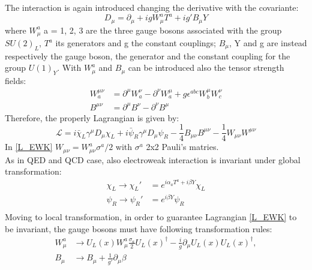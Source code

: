 The interaction is again introduced changing the derivative with the covariante:
\begin{equation}
D_{\mu} = \partial_{\mu} + igW_{\mu}^{a}T^{a} + ig'B_{\mu}Y
\label{D_EWK}
\end{equation}
where $W_{\mu}^{a}$ a = 1, 2, 3 are the three gauge bosons associated with the group $SU(2)_{L}$, $T^{a}$ its generators and g the constant couplings; $B_{\mu}$, Y and g are instead respectively the gauge boson, the generator and the constant coupling for the group $U(1)_{Y}$.
With $W_{\mu}^{a}$ and $B_{\mu}$ can be introduced also the tensor strength fields:
\begin{equation}
\begin{split}
W^{\mu\nu}_{a} &= \partial^{\mu}W^{\nu}_{a} - \partial^{\nu}W^{\mu}_{a} + g\epsilon^{abc}W^{\mu}_{b}W^{\nu}_{c} \\
B^{\mu\nu} 	 &= \partial^{\mu}B^{\nu} - \partial^{\nu}B^{\mu}
\label{WB_munu}
\end{split}
\end{equation}
Therefore, the properly Lagrangian is given by:
\begin{equation}
\mathcal{L} = i\bar{\chi}_{L}\gamma^{\mu}D_{\mu}\chi_{L} + i\bar{\psi}_{R}\gamma^{\mu}D_{\mu}\psi_{R} - \frac{1}{4}B_{\mu\nu}B^{\mu\nu} - \frac{1}{4}W_{\mu\nu}W^{\mu\nu}
\label{L_EWK}
\end{equation}
In \ref{L_EWK} $W_{\mu\nu} = W^{a}_{\mu\nu}\sigma^{a}/2$ with $\sigma^{a}$ 2x2 Pauli's matries. \\
As in QED and QCD case, also electroweak interaction is invariant under global transformation:
\begin{equation}
\begin{split}
\chi_{L} \to \chi_{L}' &= e^{i\alpha_{a} T^{a}  + i\beta Y} \chi_{L} \\
\psi_{R} \to \psi_{R}' &= e^{i\beta Y} \psi_{R} \\
\label{EWK_global}
\end{split}
\end{equation}
Moving to local transformation, in order to guarantee Lagrangian \ref{L_EWK} to be invariant, the gauge bosons must have following transformation rules:
\begin{equation}
\begin{split}
W^{a}_{\mu} &\to U_{L}(x) W^{a}_{\mu} \frac{\sigma_{a}}{2} U_{L}(x)^{\dagger} - \frac{i}{g}\partial_{\mu}U_{L}(x) U_{L}(x)^{\dagger}, \\
B_{\mu} &\to B_{\mu} + \frac{1}{g'}\partial_{\mu}\beta
\label{EWK_global}
\end{split}
\end{equation}
